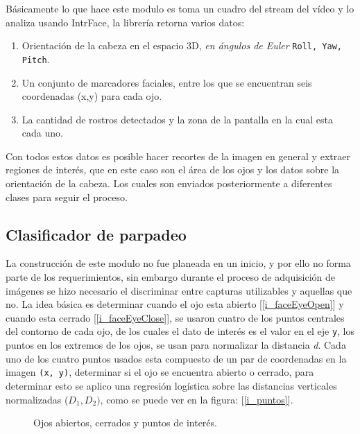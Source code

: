 \documentclass[12pt]{book} %
\begin{document}
		Básicamente lo que hace este modulo es toma un cuadro del stream del vídeo y lo analiza usando IntrFace, la librería retorna varios
		datos:
		\begin{multicols}{2}
			\begin{enumerate}
				\item Orientación de la cabeza en el espacio 3D, \textit{en ángulos de Euler} \texttt{Roll, Yaw, Pitch}.
				\item Un conjunto de marcadores faciales, entre los que se encuentran seis coordenadas (x,y) para cada ojo.
				\item La cantidad de rostros detectados y la zona de la pantalla en la cual esta cada uno.
			\end{enumerate}
		\end{multicols}
		Con todos estos datos es posible hacer recortes de la imagen en general y extraer regiones de interés, que en este caso son el 
		área  de los ojos y los datos sobre la orientación de la cabeza.
		Los cuales son enviados posteriormente a diferentes clases para seguir el proceso.

	\subsection{Clasificador de parpadeo}
		La construcción de este modulo no fue planeada en un inicio, y por ello no forma parte de los requerimientos, sin embargo
		durante el proceso de adquisición de imágenes se hizo necesario el discriminar entre capturas utilizables y aquellas que no.
		La idea básica es determinar cuando el ojo esta abierto [\ref{i_faceEyeOpen}] y cuando esta cerrado [\ref{i_faceEyeClose}], 
		se usaron cuatro de los puntos centrales del contorno de cada ojo, de los cuales el dato de interés es el valor en el eje \texttt{y},
		los puntos en los extremos de los ojos, se usan para normalizar la distancia \textit{d}.
		Cada uno de los cuatro puntos usados esta compuesto de un par de coordenadas en la imagen \texttt{(x, y)}, determinar si el ojo se 
		encuentra abierto o cerrado, para determinar esto se aplico una regresión logística sobre las distancias verticales normalizadas 
		($D_{1}, D_{2})$, como se puede ver en la figura: [\ref{i_puntos}].		
		\begin{figure}[t]
			\centering
			\caption{Ojos abiertos, cerrados y puntos de interés. }
		\end{figure}	
		
\end{document}
